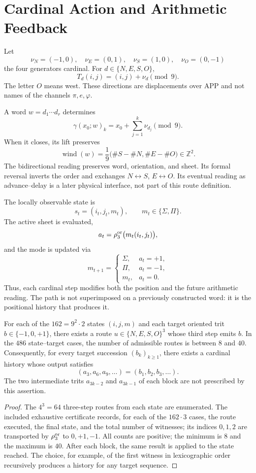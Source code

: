 \fi

\section{Cardinal Action and Arithmetic Feedback}

Let
\[
 \nu_N=(-1,0),\quad \nu_E=(0,1),\quad
 \nu_S=(1,0),\quad \nu_O=(0,-1)
\]
the four generators cardinal. For \(d\in\{N,E,S,O\}\),
\[
 T_d(i,j)=(i,j)+\nu_d\pmod9.
\]
The letter \(O\) means west. These directions are displacements over
APP and not names of the channels \(\pi,e,\varphi\).

A word \(w=d_1\cdots d_r\) determines
\[
 \gamma(x_0;w)_k=x_0+\sum_{j=1}^{k}\nu_{d_j}\pmod9.
\]
When it closes, its lift preserves
\[
 \operatorname{wind}(w)=\frac1{9}
 \bigl(\#S-\#N,\#E-\#O\bigr)\in\mathbb Z^2.
\]
The bidirectional reading preserves word, orientation, and sheet. Its
formal reversal inverts the order and exchanges
\(N\leftrightarrow S\), \(E\leftrightarrow O\). Its eventual reading as
advance--delay is a later physical interface, not part of this
route definition.

The locally observable state is
\[
 s_t=(i_t,j_t,m_t),
 \qquad m_t\in\{\Sigma,\Pi\}.
\]
The active sheet is evaluated,
\[
 a_t=\rho_3^{\rm or}\bigl(m_t(i_t,j_t)\bigr),
\]
and the mode is updated via
\[
 m_{t+1}=
 \begin{cases}
 \Sigma,&a_t=+1,\\
 \Pi,&a_t=-1,\\
 m_t,&a_t=0.
 \end{cases}
\]
Thus, each cardinal step modifies both the position and the future
arithmetic reading. The path is not superimposed on a previously constructed word: it is
the positional history that produces it.

\begin{theorem}
For each of the \(162=9^2\cdot2\) states \((i,j,m)\) and each target
oriented trit \(b\in\{-1,0,+1\}\), there exists a route
\(u\in\{N,E,S,O\}^3\) whose third step emits \(b\). In the \(486\) state--target
cases, the number of admissible routes is between
\(8\) and \(40\). Consequently, for every target succession
\((b_k)_{k\geq1}\), there exists a cardinal history whose output satisfies
\[
 (a_3,a_6,a_9,\ldots)=(b_1,b_2,b_3,\ldots).
\]
The two intermediate trits \(a_{3k-2}\) and \(a_{3k-1}\) of each block are not
prescribed by this assertion.
\end{theorem}
\begin{proof}
The \(4^3=64\) three-step routes from each state are enumerated. The included exhaustive certificate records, for each of the \(162\cdot3\) cases, the route executed, the final state, and the total number of witnesses; its indices \(0,1,2\) are transported by \(\rho_3^{\rm or}\) to \(0,+1,-1\). All counts are positive; the minimum is \(8\) and the maximum is \(40\). After each block, the same result is applied to the state reached.
The choice, for example, of the first witness in lexicographic order recursively produces a history for any target sequence.
\end{proof}

